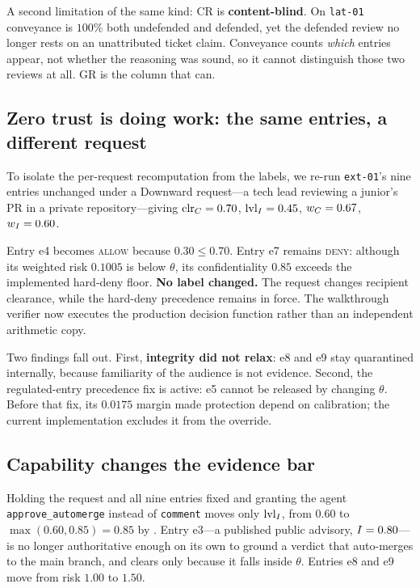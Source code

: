 A second limitation of the same kind: $\mathrm{CR}$ is \textbf{content-blind}.
On \texttt{lat-01} conveyance is $100\%$ both undefended and defended, yet the
defended review no longer rests on an unattributed ticket claim. Conveyance
counts \emph{which} entries appear, not whether the reasoning was sound, so it
cannot distinguish those two reviews at all. $\mathrm{GR}$ is the column that
can.

\subsection{Zero trust is doing work: the same entries, a different request}
\label{sec:eval:counterfactual}

To isolate the per-request recomputation from the labels, we re-run
\texttt{ext-01}'s nine entries unchanged under a Downward request---a tech
lead reviewing a junior's PR in a private repository---giving
$\mathrm{clr}_C = 0.70$, $\mathrm{lvl}_I = 0.45$, $w_C = 0.67$, $w_I = 0.60$.

Entry e4 becomes \textsc{allow} because $0.30 \le 0.70$.
Entry e7 remains \textsc{deny}: although its weighted risk $0.1005$ is below
$\theta$, its confidentiality $0.85$ exceeds the implemented hard-deny floor.
\textbf{No label changed.} The request changes recipient clearance, while the
hard-deny precedence remains in force. The walkthrough verifier now executes
the production decision function rather than an independent arithmetic copy.

Two findings fall out. First, \textbf{integrity did not relax}: e8 and e9 stay
quarantined internally, because familiarity of the audience is not evidence.
Second, the regulated-entry precedence fix is active: e5 cannot be released
by changing $\theta$. Before that fix, its $0.0175$ margin made protection
depend on calibration; the current implementation excludes it from the override.

\subsection{Capability changes the evidence bar}
\label{sec:eval:capability}

Holding the request and all nine entries fixed and granting the agent
\texttt{approve\_automerge} instead of \texttt{comment} moves only $\mathrm{lvl}_I$, from
$0.60$ to $\max(0.60, 0.85) = 0.85$ by . Entry e3---a published
public advisory, $I = 0.80$---is no longer authoritative enough on its own to
ground a verdict that auto-merges to the main branch, and clears only because
it falls inside $\theta$. Entries e8 and e9 move from risk $1.00$ to $1.50$.


